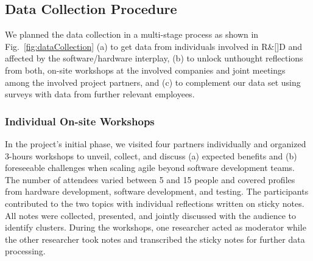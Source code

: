 \documentclass[10pt,a4paper]{IEEEtran} %
\begin{document}
\subsection{Data Collection Procedure}

We planned the data collection in a multi-stage process as shown in
Fig.~\ref{fig:dataCollection} (a) to get
data from individuals involved in R\&[]D and affected by the software/hardware interplay, (b) to unlock unthought reflections from both, on-site workshops at the involved companies and joint meetings among the involved project partners, and (c) to complement
our data set using surveys with data from further relevant employees.


\subsubsection{Individual On-site Workshops}

In the project's initial phase, we visited four partners individually and organized 3-hours workshops to unveil, collect, and discuss (a) expected benefits and (b) foreseeable challenges when scaling agile beyond software development teams. The number of attendees varied between 5 and 15 people and covered profiles from hardware development, software development, and testing. The participants contributed to the two topics with individual
reflections written on sticky notes. All notes were collected, presented, and jointly discussed with the audience to identify clusters. During the workshops, one researcher acted as moderator while the other researcher took notes and transcribed the sticky notes for further data processing. 

\begin{comment}
\begin{figure*}[t]
\centering
\texttt{[image: dataCollection.pdf]}
\caption{Overview of the data collection and analysis procedure: Out of the six participating companies during the project, we selected four companies to extract expected benefits and foreseeable challenges based on on-site workshops, separate surveys per company, and joint workshops involving all four companies. From the identified challenges, we designed a questionnaire that we used to conduct individual interviews with three senior engineers respectively, who specialized in software, hardware, and mechanics per company. We used two companies to confirm findings for agile practices particular to mechatronics.}
\label{fig:dataCollection}
\end{figure*}
\end{comment}
\end{document}
